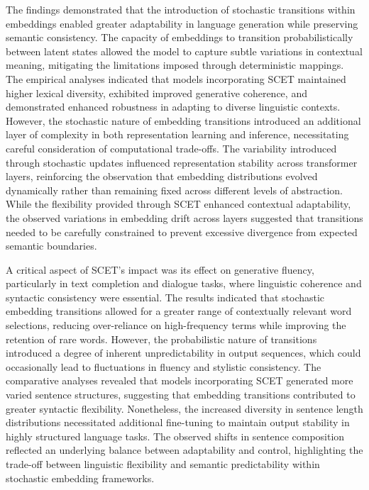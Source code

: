 \documentclass{article}
\begin{document}
The findings demonstrated that the introduction of stochastic transitions within embeddings enabled greater adaptability in language generation while preserving semantic consistency. The capacity of embeddings to transition probabilistically between latent states allowed the model to capture subtle variations in contextual meaning, mitigating the limitations imposed through deterministic mappings. The empirical analyses indicated that models incorporating SCET maintained higher lexical diversity, exhibited improved generative coherence, and demonstrated enhanced robustness in adapting to diverse linguistic contexts. However, the stochastic nature of embedding transitions introduced an additional layer of complexity in both representation learning and inference, necessitating careful consideration of computational trade-offs. The variability introduced through stochastic updates influenced representation stability across transformer layers, reinforcing the observation that embedding distributions evolved dynamically rather than remaining fixed across different levels of abstraction. While the flexibility provided through SCET enhanced contextual adaptability, the observed variations in embedding drift across layers suggested that transitions needed to be carefully constrained to prevent excessive divergence from expected semantic boundaries.

A critical aspect of SCET's impact was its effect on generative fluency, particularly in text completion and dialogue tasks, where linguistic coherence and syntactic consistency were essential. The results indicated that stochastic embedding transitions allowed for a greater range of contextually relevant word selections, reducing over-reliance on high-frequency terms while improving the retention of rare words. However, the probabilistic nature of transitions introduced a degree of inherent unpredictability in output sequences, which could occasionally lead to fluctuations in fluency and stylistic consistency. The comparative analyses revealed that models incorporating SCET generated more varied sentence structures, suggesting that embedding transitions contributed to greater syntactic flexibility. Nonetheless, the increased diversity in sentence length distributions necessitated additional fine-tuning to maintain output stability in highly structured language tasks. The observed shifts in sentence composition reflected an underlying balance between adaptability and control, highlighting the trade-off between linguistic flexibility and semantic predictability within stochastic embedding frameworks.
\end{document}
